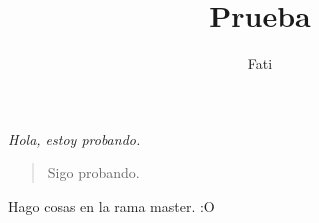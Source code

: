 \documentclass{article}
\begin{document}
\title{Prueba}
\author{Fati}
\maketitle

\emph{Hola, estoy probando.}

\begin{verse}
Sigo probando. 
\end{verse}
Hago cosas en la rama master. :O
\end{document}
